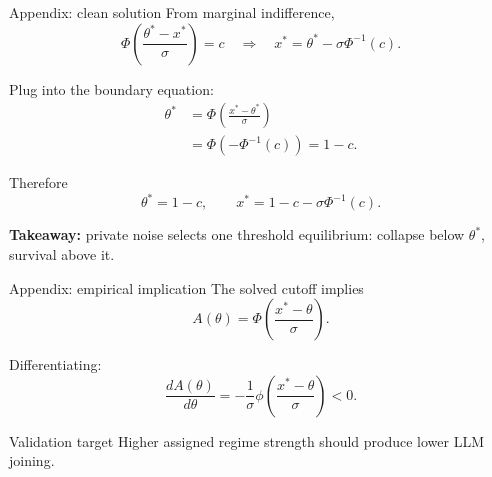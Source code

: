 \documentclass[aspectratio=169,12pt]{beamer}
\begin{document}
\begin{frame}{Appendix: clean solution}
  \footnotesize
  From marginal indifference,
  \[
    \Phi\left(\frac{\theta^*-x^*}{\sigma}\right)=c
    \quad\Rightarrow\quad
    x^*=\theta^*-\sigma\Phi^{-1}(c).
  \]

  \vspace{-0.15cm}
  Plug into the boundary equation:
  \begin{align*}
    \theta^*
    &=\Phi\left(\frac{x^*-\theta^*}{\sigma}\right)\\
    &=\Phi\left(-\Phi^{-1}(c)\right)=1-c.
  \end{align*}

  \vspace{-0.2cm}
  Therefore
  \[
    \theta^*=1-c,
    \qquad
    x^*=1-c-\sigma\Phi^{-1}(c).
  \]

  \vspace{-0.15cm}
  {\small\color{muted}\textbf{Takeaway:} private noise selects one threshold equilibrium: collapse below $\theta^*$, survival above it.}
\end{frame}

\begin{frame}{Appendix: empirical implication}
  \large
  The solved cutoff implies
  \[
    A(\theta)=\Phi\left(\frac{x^*-\theta}{\sigma}\right).
  \]

  \medskip
  Differentiating:
  \[
    \frac{dA(\theta)}{d\theta}
    =-\frac{1}{\sigma}\phi\left(\frac{x^*-\theta}{\sigma}\right)<0.
  \]

  \medskip
  \begin{block}{Validation target}
    \normalsize
    Higher assigned regime strength should produce lower LLM joining.
  \end{block}
\end{frame}
\end{document}
